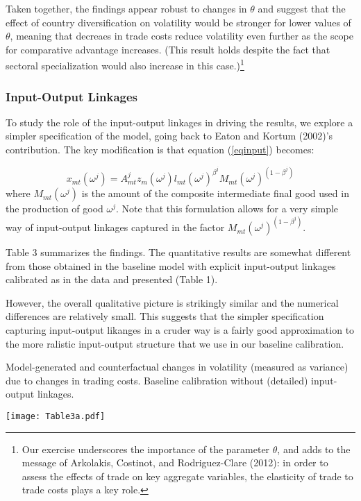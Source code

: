\documentclass[12pt]{article}
\begin{document}
Taken together, the findings appear robust to changes in $\theta $ and
suggest that the effect of country diversification on volatility would be
stronger for lower values of $\theta $, meaning that decreaes in trade costs
reduce volatility even further as the scope for comparative advantage
increases. (This result holds despite the fact that sectoral specialization
would also increase in this case.)\footnote{%
Our exercise underscores the importance of the parameter $\theta $, and adds
to the message of Arkolakis, Costinot, and Rodriguez-Clare (2012): in order
to assess the effects of trade on key aggregate variables, the elasticity of
trade to trade costs plays a key role.}

\subsubsection{Input-Output Linkages}

To study the role of the input-output linkages in driving the results, we
explore a simpler specification of the model, going back to Eaton and Kortum
(2002)'s contribution. The key modification is that equation (\ref{eqinput})
becomes:

\begin{equation}
x_{mt}(\omega ^{j})=A_{mt}^{j}z_{m}(\omega ^{j})l_{mt}(\omega ^{j})^{\beta
^{j}}M_{mt}(\omega ^{j})^{(1-\beta ^{j})}  \label{iosimple}
\end{equation}%
where $M_{mt}(\omega ^{j})$ is the amount of the composite intermediate
final good used in the production of good $\omega ^{j}$. Note that this
formulation allows for a very simple way of input-output linkages captured
in the factor $M_{mt}(\omega ^{j})^{(1-\beta ^{j})}$.

Table $3$ summarizes the findings. The quantitative results are somewhat
different from those obtained in the baseline model with explicit
input-output linkages calibrated as in the data and presented (Table 1). 

However, the overall qualitative picture is strikingly similar and the
numerical differences are relatively small. This suggests that the simpler
specification capturing input-output likanges in a cruder way is a fairly
good approximation to the more ralistic input-output structure that we use
in our baseline calibration.

\begin{table}[h]
\caption{Model-generated and counterfactual changes in volatility (measured
as variance) due to changes in trading costs. Baseline calibration without
(detailed) input-output linkages.}\centering\texttt{[image: Table3a.pdf]}
\end{table}
\end{document}
